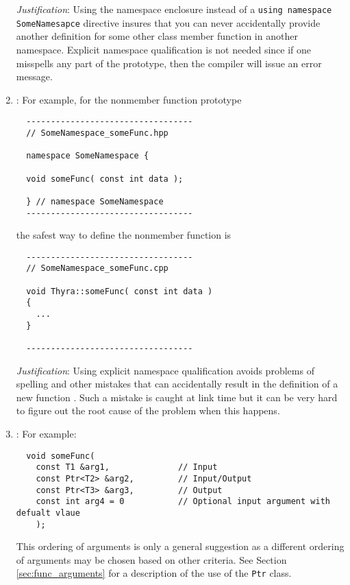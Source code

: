\begin{enumerate}
{}\textit{Justification}: Using the namespace enclosure instead of a
{}\texttt{using namespace SomeNamesapce} directive insures that you can never
accidentally provide another definition for some other class member function
in another namespace.  Explicit namespace qualification is not needed since if
one misspells any part of the prototype, then the compiler will issue an error
message.

{}\item\GCGNamespaceFuncDefs: For example, for the nonmember function prototype

{\small\begin{verbatim}
  ----------------------------------
  // SomeNamespace_someFunc.hpp

  namespace SomeNamespace {

  void someFunc( const int data );

  } // namespace SomeNamespace
  ----------------------------------
\end{verbatim}}

the safest way to define the nonmember function is

{\small\begin{verbatim}
  ----------------------------------
  // SomeNamespace_someFunc.cpp

  void Thyra::someFunc( const int data )
  {
    ...
  }

  ----------------------------------
\end{verbatim}}

{}\textit{Justification}: Using explicit namespace qualification avoids
problems of spelling and other mistakes that can accidentally result in the
definition of a new function {}\cite[Section 8.2]{stroustrup97}.  Such a
mistake is caught at link time but it can be very hard to figure out the root
cause of the problem when this happens.

{}\item\GCGFuncArgsOrder: For example:

{\small\begin{verbatim}
  void someFunc(
    const T1 &arg1,              // Input
    const Ptr<T2> &arg2,         // Input/Output
    const Ptr<T3> &arg3,         // Output
    const int arg4 = 0           // Optional input argument with defualt vlaue
    );
\end{verbatim}}

This ordering of arguments is only a general suggestion as a different
ordering of arguments may be chosen based on other criteria.  See Section
{}\ref{sec:func_arguments} for a description of the use of the {}\texttt{Ptr}
class.


\end{enumerate}
